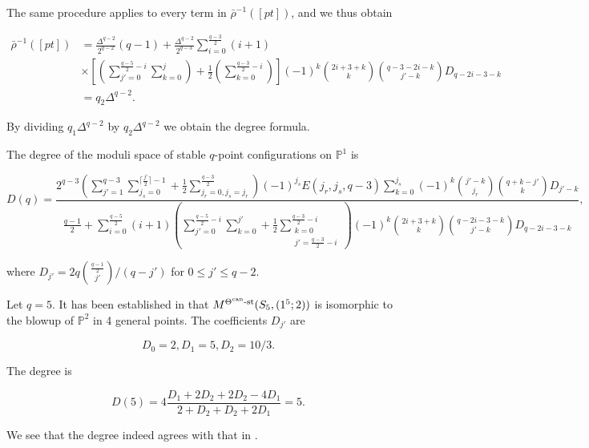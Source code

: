 \documentclass[11pt]{article}
\begin{document}
The same procedure applies to every term in \(\bar{\rho}^{-1}([pt])\), and we thus obtain 

\begin{align*}
    \bar{\rho}^{-1}([pt]) &= \frac{\Delta^{q-2}}{2^{q-2}}(q-1) + \frac{\Delta^{q-2}}{2^{q - 3}}\sum_{i = 0}^{\frac{q-3}{2}}(i+1)\\ 
    &\times\left[\left(\sum_{j'=0}^{\frac{q-5}{2}-i}\sum_{k=0}^j\right) + \frac{1}{2}\left(\sum_{k=0}^{\frac{q-3}{2}-i}\right)\right](-1)^k\binom{2i+3+k}{k}\binom{q-3-2i-k}{j'-k}D_{q-2i-3-k}\\ 
    &= q_2\Delta^{q-2}.
\end{align*}

By dividing \(q_1\Delta^{q-2}\) by \(q_2\Delta^{q-2}\) we obtain the degree formula.

\begin{proposition}\label{Proposition:point-config-deg}
    The degree of the moduli space of stable \(q\)-point configurations on \(\mathbb{P}^1\) is 

    \begin{equation*}
        D(q) = \frac{2^{q-3}\left(\sum\limits_{j'=1}^{q-3}\sum\limits_{j_s=0}^{\lceil \frac{j'}{2}\rceil-1}+\frac{1}{2}\sum\limits_{j_r=0,j_s=j_r}^{\frac{q-3}{2}}\right)(-1)^{j_s}E(j_r, j_s, q-3)\sum\limits_{k=0}^{j_s}(-1)^k\binom{j'-k}{j_r}\binom{q+k-j'}{k}D_{j'-k}}{\frac{q-1}{2} + \sum\limits_{i = 0}^{\frac{q-5}{2}}(i+1)\left(\sum\limits_{j' = 0}^{\frac{q-5}{2}-i}\sum\limits_{k=0}^{j'} + \frac{1}{2}\sum\limits_{\substack{k=0\\j'=\frac{q-3}{2}-i}}^{\frac{q-3}{2}-i}\right)(-1)^k\binom{2i+3+k}{k}\binom{q-2i-3-k}{j'-k}D_{q-2i-3-k}},
    \end{equation*}

    where \(D_{j'} = 2q\binom{\frac{q-1}{2}}{j'} / (q-j')\) for \(0\leq j'\leq q-2\).
\end{proposition}

\begin{example}
    Let \(q = 5\). It has been established in \cite[Section 5.1]{frRe2021fano} that \(M^{\Theta^{\text{can}}\text{-st}}(S_5, (1^5;2))\) is isomorphic to the blowup of \(\mathbb{P}^2\) in 4 general points. The coefficients \(D_{j'}\) are

    \[
    D_0 = 2, D_1 = 5, D_2 =10/3.
    \]

    The degree is 

    \[
    D(5) = 4\frac{D_1 + 2D_2 + 2D_2 - 4D_1}{2 + D_2 + D_2 + 2D_1} = 5.
    \]

    We see that the degree indeed agrees with that in \cite{fanography}. 
\end{example}
\end{document}
